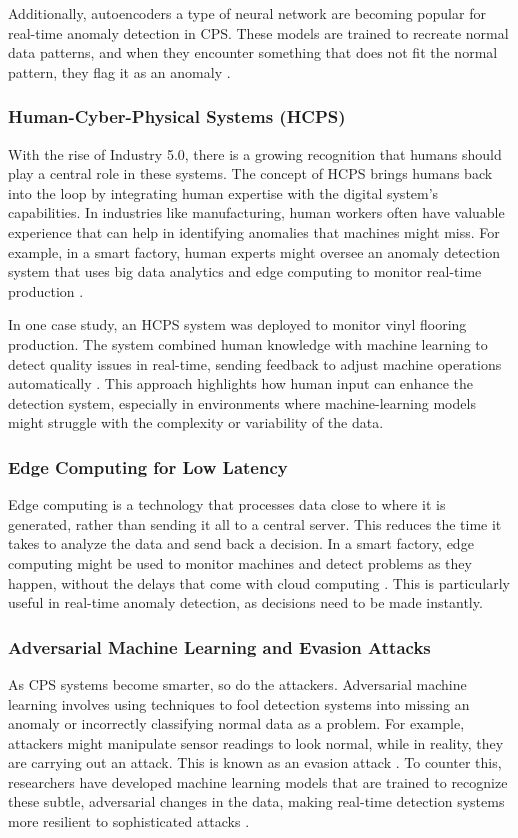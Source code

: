 Additionally, autoencoders a type of neural network are becoming popular for real-time anomaly detection in CPS. These models are trained to recreate normal data patterns, and when they encounter something that does not fit the normal pattern, they flag it as an anomaly \cite{15}.

\subsubsection{Human-Cyber-Physical Systems (HCPS)}
With the rise of Industry 5.0, there is a growing recognition that humans should play a central role in these systems. The concept of HCPS brings humans back into the loop by integrating human expertise with the digital system's capabilities. In industries like manufacturing, human workers often have valuable experience that can help in identifying anomalies that machines might miss. For example, in a smart factory, human experts might oversee an anomaly detection system that uses big data analytics and edge computing to monitor real-time production \cite{101}.

In one case study, an HCPS system was deployed to monitor vinyl flooring production. The system combined human knowledge with machine learning to detect quality issues in real-time, sending feedback to adjust machine operations automatically \cite{101}. This approach highlights how human input can enhance the detection system, especially in environments where machine-learning models might struggle with the complexity or variability of the data.

\subsubsection{Edge Computing for Low Latency}
Edge computing is a technology that processes data close to where it is generated, rather than sending it all to a central server. This reduces the time it takes to analyze the data and send back a decision. In a smart factory, edge computing might be used to monitor machines and detect problems as they happen, without the delays that come with cloud computing \cite{100,101}. This is particularly useful in real-time anomaly detection, as decisions need to be made instantly.

\subsubsection{Adversarial Machine Learning and Evasion Attacks}
As CPS systems become smarter, so do the attackers. Adversarial machine learning involves using techniques to fool detection systems into missing an anomaly or incorrectly classifying normal data as a problem. For example, attackers might manipulate sensor readings to look normal, while in reality, they are carrying out an attack. This is known as an evasion attack \cite{96}. To counter this, researchers have developed machine learning models that are trained to recognize these subtle, adversarial changes in the data, making real-time detection systems more resilient to sophisticated attacks \cite{96}.

